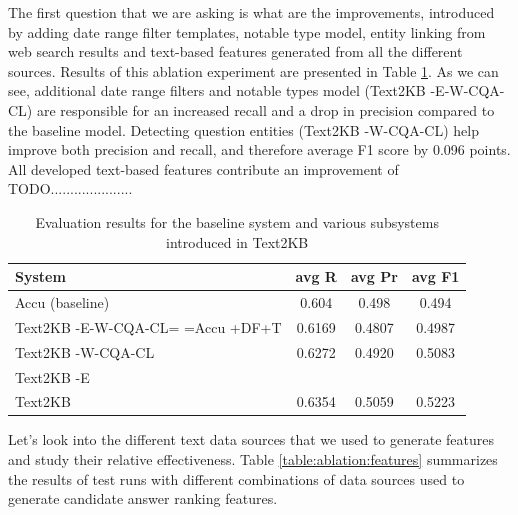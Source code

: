 The first question that we are asking is what are the improvements, introduced by adding date range filter templates, notable type model, entity linking from web search results and text-based features generated from all the different sources.
Results of this ablation experiment are presented in Table \ref{table:ablation:entities_vs_features}.
As we can see, additional date range filters and notable types model (Text2KB -E-W-CQA-CL) are responsible for an increased recall and a drop in precision compared to the baseline model.
Detecting question entities (Text2KB -W-CQA-CL) help improve both precision and recall, and therefore average F1 score by 0.096 points.
All developed text-based features contribute an improvement of TODO.....................

\begin{table}
\caption{Evaluation results for the baseline system and various subsystems introduced in Text2KB}
\label{table:ablation:entities_vs_features}
\begin{tabular}{| p{4.2cm} | c | c | c | }
\hline
System & avg R & avg Pr &  avg F1 \\
\hline
Accu (baseline) & 0.604 & 0.498 & 0.494\\
Text2KB -E-W-CQA-CL= =Accu +DF+T & 0.6169 & 0.4807 & 0.4987 \\
Text2KB -W-CQA-CL & 0.6272 & 0.4920 & 0.5083 \\  %
Text2KB -E &  &  &  \\  %
\hline
Text2KB & 0.6354 & 0.5059 & 0.5223 \\
\hline
\end{tabular}
\end{table}

Let's look into the different text data sources that we used to generate features and study their relative effectiveness.
Table \ref{table:ablation:features} summarizes the results of test runs with different combinations of data sources used to generate candidate answer ranking features.

